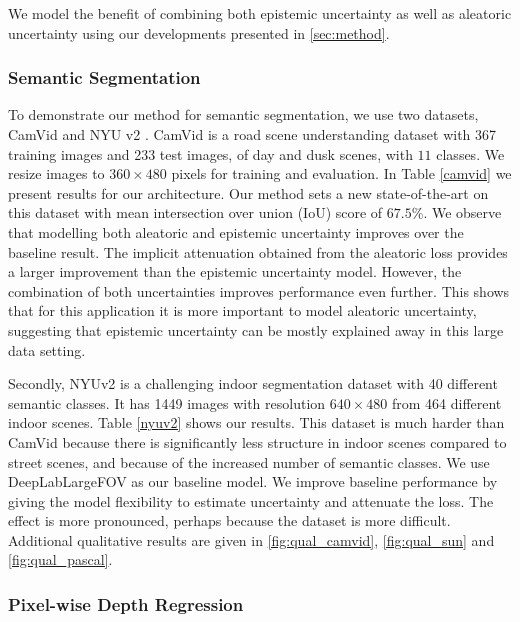 We model the benefit of combining both epistemic uncertainty as well as aleatoric uncertainty using our developments presented in \cref{sec:method}. 

\subsubsection{Semantic Segmentation}

To demonstrate our method for semantic segmentation, we use two datasets, CamVid \citep{brostow2009semantic} and NYU v2 \citep{silberman2012indoor}. CamVid is a road scene understanding dataset with 367 training images and 233 test images, of day and dusk scenes, with $11$ classes. We resize images to $360\times480$ pixels for training and evaluation. In Table \ref{camvid} we present results for our architecture. Our method sets a new state-of-the-art on this dataset with mean intersection over union (IoU) score of $67.5\%$. We observe that modelling both aleatoric and epistemic uncertainty improves over the baseline result.  The implicit attenuation obtained from the aleatoric loss provides a larger improvement than the epistemic uncertainty model. However, the combination of both uncertainties improves performance even further. This shows that for this application it is more important to model aleatoric uncertainty, suggesting that epistemic uncertainty can be mostly explained away in this large data setting.

Secondly, NYUv2 \citep{silberman2012indoor} is a challenging indoor segmentation dataset with 40 different semantic classes. It has 1449 images with resolution $640\times480$ from 464 different indoor scenes. Table \ref{nyuv2} shows our results. This dataset is much harder than CamVid because there is significantly less structure in indoor scenes compared to street scenes, and because of the increased number of semantic classes. We use DeepLabLargeFOV \citep{chen2016deeplab} as our baseline model. We improve baseline performance by giving the model flexibility to estimate uncertainty and attenuate the loss. The effect is more pronounced, perhaps because the dataset is more difficult. Additional qualitative results are given in \cref{fig:qual_camvid}, \cref{fig:qual_sun} and \cref{fig:qual_pascal}.



\subsubsection{Pixel-wise Depth Regression}

